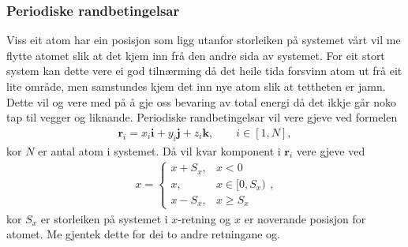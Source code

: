 \documentclass[12pt, a4paper]{article}
\theoremstyle{definition} \newtheorem*{definition}{Teorem}
\newcommand{\vb}{\mathbf}
\begin{document}
        \subsubsection*{Periodiske randbetingelsar}
            Viss eit atom har ein 
            posisjon som ligg utanfor storleiken på systemet vårt vil me flytte atomet slik at det kjem inn frå den andre sida av systemet. For eit stort system kan dette 
            vere ei god tilnærming då det heile tida forsvinn atom ut frå eit lite område, men samstundes kjem det inn nye atom slik at tettheten er jamn. Dette vil og vere med
            på å gje oss bevaring av total energi då det ikkje går noko tap til vegger og liknande. Periodiske randbetingelsar vil vere gjeve ved formelen
            \begin{align*}
                \vb{r}_i = x_i\vb{i} + y_i\vb{j} + z_i\vb{k}, \qquad i \in [1, N],
            \end{align*}
            kor $N$ er antal atom i systemet. Då vil kvar komponent i $\vb{r}_i$ vere gjeve ved
            \begin{align*}
                x = 
                \begin{cases}
                    x + S_x, & x < 0 \\
                    x, & x \in [0, S_x) \\
                    x - S_x, & x \geq S_x
                \end{cases},
            \end{align*}
            kor $S_x$ er storleiken på systemet i $x$-retning og $x$ er noverande posisjon for atomet. Me gjentek dette for dei to andre retningane og.
\end{document}
